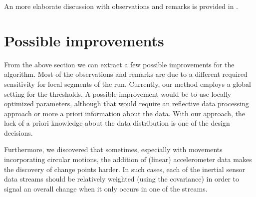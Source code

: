 An more elaborate discussion with observations and remarks is provided in .

\section{Possible improvements}\label{sec:possible_improvements}
From the above section we can extract a few possible improvements for the algorithm.
Most of the observations and remarks are due to a different required sensitivity for local segments of the run.
Currently, our method employs a global setting for the thresholds.
A possible improvement would be to use locally optimized parameters, although that would require an reflective data processing approach or more a priori information about the data.
With our approach, the lack of a priori knowledge about the data distribution is one of the design decisions.

Furthermore, we discovered that sometimes, especially with movements incorporating circular motions, the addition of (linear) accelerometer data makes the discovery of change points harder.
In such cases, each of the inertial sensor data streams should be relatively weighted (\eg using the covariance) in order to signal an overall change when it only occurs in one of the streams.
